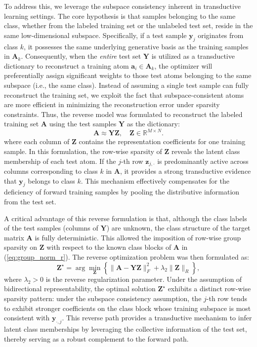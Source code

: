 \documentclass[10pt,comsoc]{IEEEtran}
\begin{document}
To address this, we leverage the subspace consistency inherent in transductive learning settings. 
The core hypothesis is that samples belonging to the same class, whether from the labeled training set or the unlabeled test set, reside in the same low-dimensional subspace. Specifically, if a test sample $\mathbf{y}_j$ originates from class $k$, it possesses the same underlying generative basis as the training samples in $\mathbf{A}_k$. Consequently, when the \textit{entire} test set $\mathbf{Y}$ is utilized as a transductive dictionary to reconstruct a training atom $\mathbf{a}_i \in \mathbf{A}_k$, the optimizer will preferentially assign significant weights to those test atoms belonging to the same subspace (i.e., the same class). 
Instead of assuming a single test sample can fully reconstruct the training set, we exploit the fact that subspace-consistent atoms are more efficient in minimizing the reconstruction error under sparsity constraints. Thus, the reverse model was formulated to reconstruct the labeled training set $\mathbf{A}$ using the test samples $\mathbf{Y}$ as the dictionary:
\begin{equation}
\label{eq:reverse_model}
\mathbf{A} \approx \mathbf{YZ}, \quad \mathbf{Z} \in \mathbb{R}^{M \times N}.
\end{equation}
where each column of $\mathbf{Z}$ contains the representation coefficients for one training sample. 
In this formulation, the row-wise sparsity of $\mathbf{Z}$ reveals the latent class membership of each test atom. If the $j$-th row $\mathbf{z}_{j,\cdot}$ is predominantly active across columns corresponding to class $k$ in $\mathbf{A}$, it provides a strong transductive evidence that $\mathbf{y}_j$ belongs to class $k$. This mechanism effectively compensates for the deficiency of forward training samples by pooling the distributive information from the test set.

A critical advantage of this reverse formulation is that, although the class labels of the test samples (columns of $\mathbf{Y}$) are unknown, the class structure of the target matrix $\mathbf{A}$ is fully deterministic. This allowed the imposition of row-wise group sparsity on $\mathbf{Z}$ with respect to the known class blocks of $\mathbf{A}$ in (\ref{eq:group_norm_r}). The reverse optimization problem was then formulated as:
\begin{equation}
\label{eq:reverse_opt}
\mathbf{Z}^\star = \arg\min_{\mathbf{Z}} \left\{ \|\mathbf{A} - \mathbf{YZ}\|_F^2 + \lambda_2 \|\mathbf{Z}\|_R \right\},
\end{equation}
where $\lambda_2 > 0$ is the reverse regularization parameter. Under the assumption of bidirectional representability, the optimal solution $\mathbf{Z}^\star$ exhibits a distinct row-wise sparsity pattern: under the subspace consistency assumption, the $j$-th row tends to exhibit stronger coefficients on the class block whose training subspace is most consistent with $\mathbf{y}_{\cdot, j}$.
This reverse path provides a transductive mechanism to infer latent class memberships by leveraging the collective information of the test set, thereby serving as a robust complement to the forward path.
\end{document}

